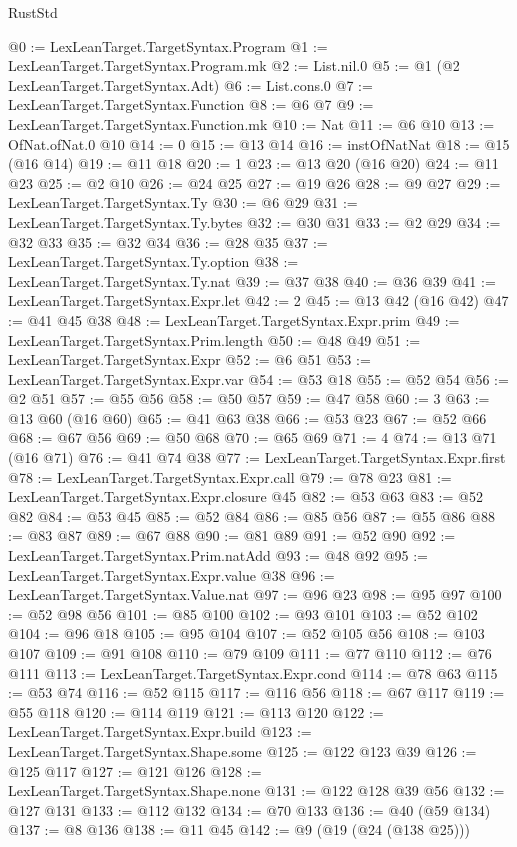 \begin{lexlean}{RustStd}
\begin{coremodule}
{\begin{coremodule}
{{{{{{{{@0 := LexLeanTarget.TargetSyntax.Program
@1 := LexLeanTarget.TargetSyntax.Program.mk
@2 := List.nil.{0}
@5 := @1 (@2 LexLeanTarget.TargetSyntax.Adt)
@6 := List.cons.{0}
@7 := LexLeanTarget.TargetSyntax.Function
@8 := @6 @7
@9 := LexLeanTarget.TargetSyntax.Function.mk
@10 := Nat
@11 := @6 @10
@13 := OfNat.ofNat.{0} @10
@14 := 0
@15 := @13 @14
@16 := instOfNatNat
@18 := @15 (@16 @14)
@19 := @11 @18
@20 := 1
@23 := @13 @20 (@16 @20)
@24 := @11 @23
@25 := @2 @10
@26 := @24 @25
@27 := @19 @26
@28 := @9 @27
@29 := LexLeanTarget.TargetSyntax.Ty
@30 := @6 @29
@31 := LexLeanTarget.TargetSyntax.Ty.bytes
@32 := @30 @31
@33 := @2 @29
@34 := @32 @33
@35 := @32 @34
@36 := @28 @35
@37 := LexLeanTarget.TargetSyntax.Ty.option
@38 := LexLeanTarget.TargetSyntax.Ty.nat
@39 := @37 @38
@40 := @36 @39
@41 := LexLeanTarget.TargetSyntax.Expr.let
@42 := 2
@45 := @13 @42 (@16 @42)
@47 := @41 @45 @38
@48 := LexLeanTarget.TargetSyntax.Expr.prim
@49 := LexLeanTarget.TargetSyntax.Prim.length
@50 := @48 @49
@51 := LexLeanTarget.TargetSyntax.Expr
@52 := @6 @51
@53 := LexLeanTarget.TargetSyntax.Expr.var
@54 := @53 @18
@55 := @52 @54
@56 := @2 @51
@57 := @55 @56
@58 := @50 @57
@59 := @47 @58
@60 := 3
@63 := @13 @60 (@16 @60)
@65 := @41 @63 @38
@66 := @53 @23
@67 := @52 @66
@68 := @67 @56
@69 := @50 @68
@70 := @65 @69
@71 := 4
@74 := @13 @71 (@16 @71)
@76 := @41 @74 @38
@77 := LexLeanTarget.TargetSyntax.Expr.first
@78 := LexLeanTarget.TargetSyntax.Expr.call
@79 := @78 @23
@81 := LexLeanTarget.TargetSyntax.Expr.closure @45
@82 := @53 @63
@83 := @52 @82
@84 := @53 @45
@85 := @52 @84
@86 := @85 @56
@87 := @55 @86
@88 := @83 @87
@89 := @67 @88
@90 := @81 @89
@91 := @52 @90
@92 := LexLeanTarget.TargetSyntax.Prim.natAdd
@93 := @48 @92
@95 := LexLeanTarget.TargetSyntax.Expr.value @38
@96 := LexLeanTarget.TargetSyntax.Value.nat
@97 := @96 @23
@98 := @95 @97
@100 := @52 @98 @56
@101 := @85 @100
@102 := @93 @101
@103 := @52 @102
@104 := @96 @18
@105 := @95 @104
@107 := @52 @105 @56
@108 := @103 @107
@109 := @91 @108
@110 := @79 @109
@111 := @77 @110
@112 := @76 @111
@113 := LexLeanTarget.TargetSyntax.Expr.cond
@114 := @78 @63
@115 := @53 @74
@116 := @52 @115
@117 := @116 @56
@118 := @67 @117
@119 := @55 @118
@120 := @114 @119
@121 := @113 @120
@122 := LexLeanTarget.TargetSyntax.Expr.build
@123 := LexLeanTarget.TargetSyntax.Shape.some
@125 := @122 @123 @39
@126 := @125 @117
@127 := @121 @126
@128 := LexLeanTarget.TargetSyntax.Shape.none
@131 := @122 @128 @39 @56
@132 := @127 @131
@133 := @112 @132
@134 := @70 @133
@136 := @40 (@59 @134)
@137 := @8 @136
@138 := @11 @45
@142 := @9 (@19 (@24 (@138 @25)))
}}}}}}}}
\end{coremodule}}
\end{coremodule}
\end{lexlean}
